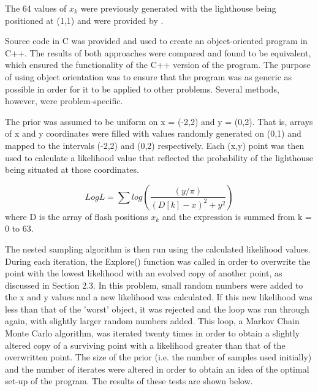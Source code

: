 \documentclass[a4paper,12pt]{article}
\begin{document}
\newpage
The 64 values of $x_{k}$ were previously generated with the lighthouse being positioned at (1,1) and were provided by \cite{sivia}.

Source code in C was provided and used to create an object-oriented program in C++.  The results of both approaches were compared and found to be equivalent, which ensured the functionality of the C++ version of the program.  The purpose of using object orientation was to ensure that the program was as generic as possible in order for it to be applied to other problems.  Several methods, however, were problem-specific.
\newline
     
The prior was assumed to be uniform on x = (-2,2) and y = (0,2).  That is, arrays of x and y coordinates were filled with values randomly generated on (0,1) and mapped to the intervals (-2,2) and (0,2) respectively.  Each (x,y) point was then used to calculate a likelihood value that reflected the probability of the lighthouse being situated at those coordinates.
\newline

\begin{equation}
 LogL = \sum log(\frac{(y/\pi)}{(D[k]-x)^{2} + y^{2}})
\end{equation}
where D is the array of flash positions $x_{k}$ and the expression is summed from k = 0 to 63.


The nested sampling algorithm is then run using the calculated likelihood values.  During each iteration, the Explore() function was called in order to overwrite the point with the lowest likelihood with an evolved copy of another point, as discussed in Section 2.3.  In this problem, small random numbers were added to the x and y values and a new likelihood was calculated.  If this new likelihood was less than that of the 'worst' object, it was rejected and the loop was run through again, with slightly larger random numbers added.  This loop, a Markov Chain Monte Carlo algorithm, was iterated twenty times in order to obtain a slightly altered copy of a surviving point with a likelihood greater than that of the overwritten point. 
\newline
The size of the prior (i.e. the number of samples used initially) and the number of iterates were altered in order to obtain an idea of the optimal set-up of the program.  The results of these tests are shown below.

\end{document}
